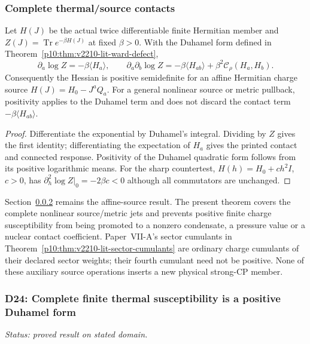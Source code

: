 \documentclass[12pt,a4paper]{article}
\begin{document}
\subsubsection{Complete thermal/source contacts}
\begin{theorem}
\label{p11:thm:v2210-lit-complete-duhamel-contacts}
Let $H(J)$ be the actual twice differentiable finite Hermitian member and
$Z(J)=\operatorname{Tr}e^{-\beta H(J)}$ at fixed $\beta>0$. With the
Duhamel form defined in
Theorem~\ref{p10:thm:v2210-lit-ward-defect},
\[
 \boxed{\partial_a\log Z=-\beta\langle H_a\rangle,
 \qquad \partial_a\partial_b\log Z
 =-\beta\langle H_{ab}\rangle
    +\beta^2\mathcal C_\rho(H_a,H_b).}
\]
Consequently the Hessian is positive semidefinite for an affine Hermitian
charge source $H(J)=H_0-J^aQ_a$. For a general nonlinear source or metric
pullback, positivity applies to the Duhamel term and does not discard the
contact term $-\beta\langle H_{ab}\rangle$.
\end{theorem}
\begin{proof}
Differentiate the exponential by Duhamel's integral. Dividing by $Z$ gives
the first identity; differentiating the expectation of $H_a$ gives the
printed contact and connected response. Positivity of the Duhamel quadratic
form follows from its positive logarithmic means. For the sharp countertest,
$H(h)=H_0+ch^2I$, $c>0$, has
$\partial_h^2\log Z|_0=-2\beta c<0$ although all commutators are unchanged.
\end{proof}
Section~\ref{p11:sec:v2201-derived-d24} remains the affine-source result.
The present theorem covers the complete nonlinear source/metric jets and
prevents positive finite charge susceptibility from being promoted to a
nonzero condensate, a pressure value or a nuclear contact coefficient.
Paper~VII-A's sector cumulants in
Theorem~\ref{p10:thm:v2210-lit-sector-cumulants} are ordinary charge
cumulants of their declared sector weights; their fourth cumulant need not
be positive. None of these auxiliary source operations inserts a new
physical strong-CP member.


\subsubsection{D24: Complete finite thermal susceptibility is a positive Duhamel form}
\label{p11:sec:v2201-derived-d24}
\noindent\textit{Status: proved result on stated domain.}
\end{document}
